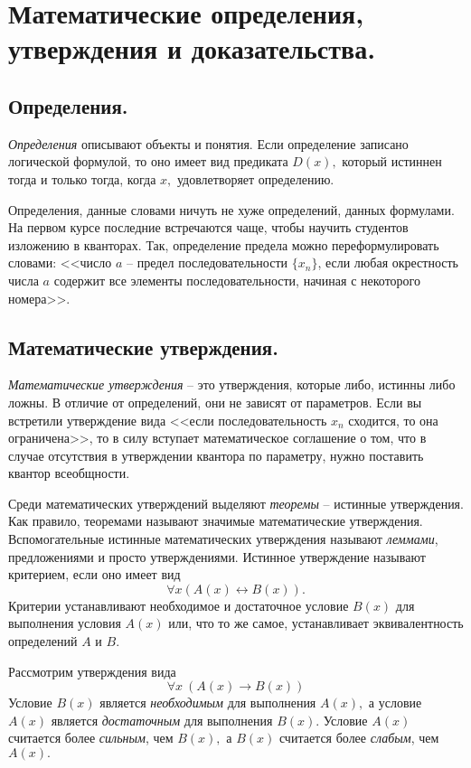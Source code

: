 
\section{Математические определения,
утверждения и доказательства.}

\subsection{Определения.}

\textit{Определения} описывают объекты и понятия. Если определение записано логической формулой, то оно имеет вид предиката $D(x),$ который истиннен тогда и только тогда, когда $x,$ удовлетворяет определению.

Определения, данные словами ничуть не хуже определений, данных формулами. На первом курсе последние встречаются чаще, чтобы научить студентов изложению в кванторах. Так, определение предела можно переформулировать словами: <<число $a$ -- предел последовательности $\{x_n\}$, если любая окрестность числа $a$ содержит все элементы последовательности, начиная с некоторого номера>>.

\subsection{Математические утверждения.}

\begin{definition}
    \textit{Математические утверждения} -- это утверждения, которые либо, истинны либо ложны. В отличие от определений, они не зависят от параметров. Если вы встретили утверждение вида <<если последовательность $x_n$ сходится, то она ограничена>>, то в силу вступает математическое соглашение о том, что в случае отсутствия в утверждении квантора по параметру, нужно поставить квантор всеобщности.
\end{definition}

Среди математических утверждений выделяют \textit{теоремы} -- истинные утверждения. Как правило, теоремами называют значимые математические утверждения. Вспомогательные истинные математических утверждения называют \textit{леммами}, предложениями и просто утверждениями. Истинное утверждение называют критерием, если оно имеет вид $$\forall x (A(x) \leftrightarrow B(x)).$$ Критерии устанавливают необходимое и достаточное условие $B(x)$ для выполнения условия $A(x)$ или, что то же самое, устанавливает эквивалентность определений $A$ и $B.$

\begin{definition}
    Рассмотрим утверждения вида
    $$\forall x \ (A(x) \rightarrow B(x)) $$
    Условие $B(x)$ является \textit{необходимым} для выполнения $A(x),$ а условие $A(x)$ является \textit{достаточным} для выполнения $B(x).$ Условие $A(x)$ считается более \textit{сильным}, чем $B(x),$ а $B(x)$ считается более \textit{слабым}, чем $A(x).$
\end{definition}

